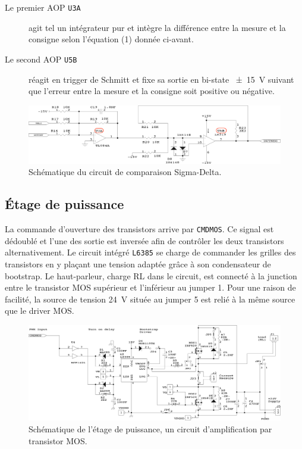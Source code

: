 \documentclass[10pt, oneside, a4paper]{article}
\begin{document}
\begin{description}
\item[Le premier AOP \texttt{U3A} ] agit tel un intégrateur pur et intègre la différence entre la mesure et la consigne selon l'équation (1) donnée ci-avant.
\item[Le second AOP \texttt{U5B} ] réagit en trigger de Schmitt et fixe sa sortie en bi-state \SI{\pm15}{\volt} suivant que l'erreur entre la mesure et la consigne soit positive ou négative. \\
\end{description}

\begin{figure}[!ht]
	\centering
	\includegraphics[width=\textwidth]{image/sch-ctrl.png}
	\caption{Schématique du circuit de comparaison Sigma-Delta.}
	\label{fig:sch-ctrl}
\end{figure}

\subsection{Étage de puissance}
La commande d'ouverture des transistors arrive par \texttt{CMDMOS}.
Ce signal est dédoublé et l'une des sortie est inversée afin de contrôler les deux transistors alternativement.
Le circuit intégré \texttt{L6385} se charge de commander les grilles des transistors en y plaçant une tension adaptée grâce à son condensateur de bootstrap.
Le haut-parleur, charge RL dans le circuit, est connecté à la junction entre le transistor MOS supérieur et l'inférieur au jumper 1.
Pour une raison de facilité, la source de tension \SI{24}{\volt} située au jumper 5 est relié à la même source que le driver MOS.

\begin{figure}[!ht]
	\centering
	\includegraphics[width=\textwidth]{image/sch-mos.png}
	\caption{Schématique de l'étage de puissance, un circuit d'amplification par transistor
			 MOS.}
	\label{fig:sch-mos}
\end{figure}
\end{document}
